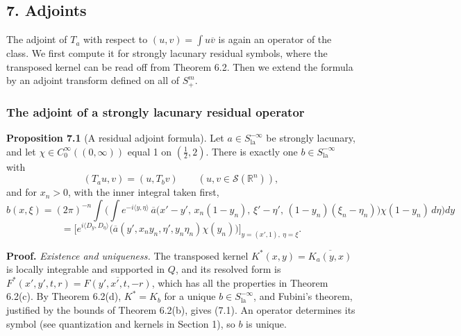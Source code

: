 \documentclass[
  11pt,
]{article}
\begin{document}
\subsection{7. Adjoints}\label{adjoints}

The adjoint of \(T_a\) with respect to \((u,v)=\int u\overline v\) is
again an operator of the class. We first compute it for strongly
lacunary residual symbols, where the transposed kernel can be read off
from Theorem 6.2. Then we extend the formula by an adjoint transform
defined on all of \(S^m_+\).

\subsubsection{The adjoint of a strongly lacunary residual
operator}\label{the-adjoint-of-a-strongly-lacunary-residual-operator}

\textbf{Proposition 7.1} (A residual adjoint formula). Let
\(a\in S^{-\infty}_{\mathrm{la}}\) be strongly lacunary, and let
\(\chi\in C_0^\infty((0,\infty))\) equal 1 on \((\tfrac12,2)\). There is
exactly one \(b\in S^{-\infty}_{\mathrm{la}}\) with \[
(T_au,v)=(u,T_bv)\qquad(u,v\in\mathcal S(\mathbb R^n)),
\tag{7.1}
\] and for \(x_n>0\), with the inner integral taken first, \[
b(x,\xi)=(2\pi)^{-n}\int\!\Big(\int e^{-i\langle y,\eta\rangle}\,\overline a\big(x'-y',\,x_n(1-y_n),\,\xi'-\eta',\,(1-y_n)(\xi_n-\eta_n)\big)\chi(1-y_n)\,d\eta\Big)dy
\tag{7.2}
\] \[
=\Big[e^{i\langle D_y,D_\eta\rangle}\big(\overline a(y',x_ny_n,\eta',y_n\eta_n)\chi(y_n)\big)\Big]_{y=(x',1),\ \eta=\xi}.
\tag{7.3}
\]

\textbf{Proof.} \emph{Existence and uniqueness.} The transposed kernel
\(K^*(x,y)=\overline{K_a(y,x)}\) is locally integrable and supported in
\(Q\), and its resolved form is
\(F^*(x',y',t,r)=\overline{F(y',x',t,-r)}\), which has all the
properties in Theorem 6.2(c). By Theorem 6.2(d), \(K^*=K_b\) for a
unique \(b\in S^{-\infty}_{\mathrm{la}}\), and Fubini's theorem,
justified by the bounds of Theorem 6.2(b), gives (7.1). An operator
determines its symbol (see quantization and kernels in Section 1), so
\(b\) is unique.
\end{document}
